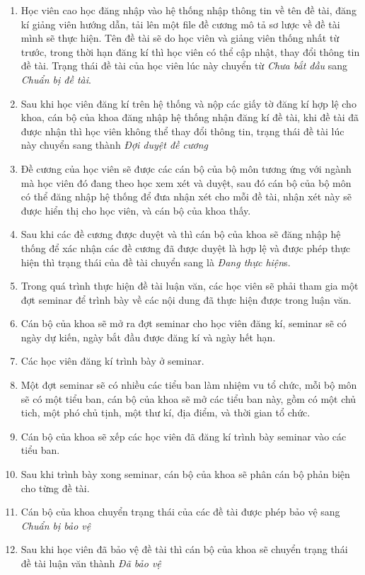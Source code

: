 \begin{enumerate}
\item Học viên cao học đăng nhập vào hệ thống nhập thông tin về tên đề tài, đăng kí giảng viên hướng dẫn, tải lên một file đề cương mô tả sơ lược về đề tài mình sẽ thực hiện. Tên đề tài sẽ do học viên và giảng viên thống nhất từ trước, trong thời hạn đăng kí thì học viên có thể cập nhật, thay đổi thông tin đề tài. Trạng thái đề tài của học viên lúc này chuyển từ \textit{Chưa bắt đầu} sang \textit{Chuẩn bị đề tài}.
\item Sau khi học viên đăng kí trên hệ thống và nộp các giấy tờ đăng kí hợp lệ cho khoa, cán bộ của khoa đăng nhập hệ thống nhận đăng kí đề tài, khi đề tài đã được nhận thì học viên không thể thay đổi thông tin, trạng thái đề tài lúc này chuyển sang thành \textit{Đợi duyệt đề cương}
\item Đề cương của học viên sẽ được các cán bộ của bộ môn tương ứng với ngành mà học viên đó đang theo học xem xét và duyệt, sau đó cán bộ của bộ môn có thể đăng nhập hệ thống để đưa nhận xét cho mỗi đề tài, nhận xét này sẽ được hiển thị cho học viên, và cán bộ của khoa thấy.
\item Sau khi các đề cương được duyệt và thì cán bộ của khoa sẽ đăng nhập hệ thống để xác nhận các đề cương đã được duyệt là hợp lệ và được phép thực hiện thì trạng thái của đề tài chuyển sang là \textit{Đang thực hiện}s.
\item Trong quá trình thực hiện đề tài luận văn, các học viên sẽ phải tham gia một đợt seminar để trình bày về các nội dung đã thực hiện được trong luận văn.
\item Cán bộ của khoa sẽ mở ra đợt seminar cho học viên đăng kí, seminar sẽ có ngày dự kiến, ngày bắt đầu được đăng kí và ngày hết hạn.
\item Các học viên đăng kí trình bày ở seminar.
\item Một đợt seminar sẽ có nhiều các tiểu ban làm nhiệm vu tổ chức, mỗi bộ môn sẽ có một tiểu ban, cán bộ của khoa sẽ mở các tiểu ban này, gồm có một chủ tich, một phó chủ tịnh, một thư kí, địa điểm, và thời gian tổ chức.
\item Cán bộ của khoa sẽ xếp các học viên đã đăng kí trình bày seminar vào các tiểu ban.
\item Sau khi trình bày xong seminar, cán bộ của khoa sẽ phân cán bộ phản biện cho từng đề tài.
\item Cán bộ của khoa chuyển trạng thái của các đề tài được phép bảo vệ sang \textit{Chuẩn bị bảo vệ}
\item Sau khi học viên đã bảo vệ đề tài thì cán bộ của khoa sẽ chuyển trạng thái đề tài luận văn thành \textit{
Đã bảo vệ}
\end{enumerate}

